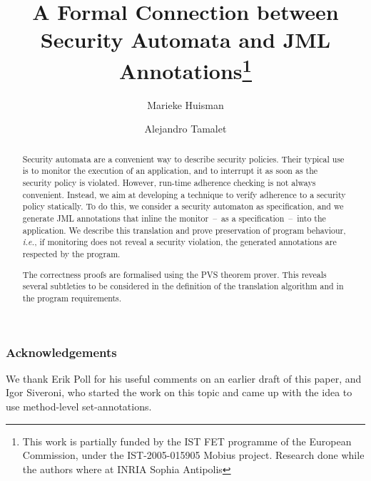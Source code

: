 \documentclass[]{llncs}
\title{A Formal Connection between Security Automata and JML
Annotations\thanks{This work is partially funded by the IST FET
programme of the European Commission, under the IST-2005-015905
\textsf{Mobius} project. Research done while the authors where at INRIA Sophia
Antipolis}}
\author{Marieke Huisman\inst{1}
 \and Alejandro Tamalet\inst{2}}
\institute{University of Twente, Netherlands \and
University of Nijmegen, Netherlands}
\begin{document}
\maketitle
\begin{abstract}
Security automata are a convenient way to describe security
policies. Their typical use is to monitor the execution of an
application, and to interrupt it as soon as the security policy is
violated. However, run-time adherence checking is not always
convenient. Instead, we aim at developing a technique to verify
adherence to a security policy statically.  To do this, we consider
a security automaton as specification, and we generate JML
annotations that inline the monitor~--~as a specification~--~into the
application.  We describe this translation and prove preservation of
program behaviour, \emph{i.e.}, if monitoring does not reveal a
security violation, the generated annotations are respected by the
program.

The correctness proofs are formalised using the PVS theorem prover.
This reveals several subtleties to be considered in the definition of the
translation algorithm and in the program requirements.
\end{abstract}












\vspace*{-0.8em}
\subsubsection*{Acknowledgements}
We thank Erik Poll for his useful comments on an earlier draft of this
paper, and Igor Siveroni, who started the work on this topic and came
up with the idea to use method-level set-annotations.
\end{document}
